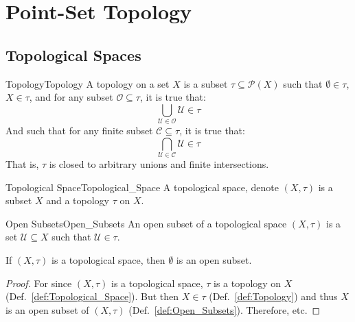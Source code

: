 \chapter{Point-Set Topology}
    \section{Topological Spaces}
        \begin{ldefinition}{Topology}{Topology}
            A topology on a set $X$ is a subset
            $\tau\subseteq\mathcal{P}(X)$ such that
            $\emptyset\in\tau$, $X\in\tau$, and for any
            subset $\mathcal{O}\subseteq\tau$, it is true that:
            \begin{equation}
                \bigcup_{\mathcal{U}\in\mathcal{O}}\mathcal{U}\in\tau
            \end{equation}
            And such that for any finite subset
            $\mathcal{C}\subseteq\tau$, it is true that:
            \begin{equation}
                \bigcap_{\mathcal{U}\in\mathcal{C}}\mathcal{U}\in\tau
            \end{equation}
            That is, $\tau$ is closed to arbitrary unions and
            finite intersections.
        \end{ldefinition}
        \begin{ldefinition}{Topological Space}{Topological_Space}
            A topological space, denote $(X,\tau)$ is a subset $X$
            and a topology $\tau$ on $X$.
        \end{ldefinition}
        \begin{ldefinition}{Open Subsets}{Open_Subsets}
            An open subset of a topological space $(X,\tau)$ is a
            set $\mathcal{U}\subseteq{X}$ such that
            $\mathcal{U}\in\tau$.
        \end{ldefinition}
        \begin{theorem}
            \label{thm:Emptyset_Is_Open}%
            If $(X,\tau)$ is a topological space, then
            $\emptyset$ is an open subset.
        \end{theorem}
        \begin{proof}
            For since $(X,\tau)$ is a topological space,
            $\tau$ is a topology on $X$
            (Def.~\ref{def:Topological_Space}). But then
            $X\in\tau$ (Def.~\ref{def:Topology}) and
            thus $X$ is an open subset of $(X,\tau)$
            (Def.~\ref{def:Open_Subsets}). Therefore, etc.
        \end{proof}
